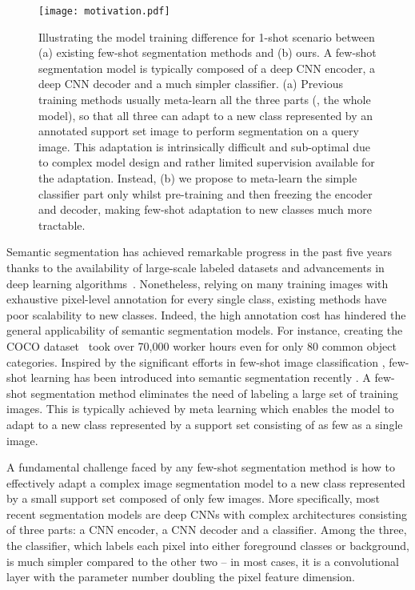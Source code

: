 \documentclass[10pt,twocolumn,letterpaper]{article}
\begin{document}
\begin{figure}[t]
    \centering
    \texttt{[image: motivation.pdf]}
    \caption{Illustrating the model training difference for 1-shot scenario between (a) existing few-shot segmentation methods and (b) ours. A few-shot segmentation model is typically composed of a deep CNN encoder, a deep CNN decoder and a much simpler classifier. (a) Previous training methods usually meta-learn all the three parts (\ie, the whole model), so that all three can adapt to a new class represented by an annotated support set image to perform segmentation on a query image. This adaptation is intrinsically difficult and sub-optimal due to complex model design and rather limited supervision available for the adaptation. 
    Instead, (b) we propose to meta-learn the simple classifier part only whilst pre-training and then freezing the encoder and decoder,
    making few-shot adaptation to new classes much more tractable.
    }
    \vspace{-0.4cm}
    \label{fig:motivation}
\end{figure}


Semantic segmentation has achieved remarkable progress in the past five years thanks to the availability of large-scale labeled datasets and advancements in deep learning algorithms~\cite{chen2017deeplab, chen2018encoder, long2015fully}. 
Nonetheless, relying on many training images with exhaustive pixel-level annotation for every single class, 
existing methods have poor scalability to new classes.  
Indeed, the high annotation cost
has hindered the general applicability of semantic segmentation models.  
For instance, creating the COCO dataset~\cite{lin2014microsoft} took over 70,000 worker hours
even for only 80 common object categories.
Inspired by the significant efforts in 
few-shot image classification \cite{snell2017prototypical,finn2017model,sung2018learning,ye2020few},
few-shot learning has been 
introduced into semantic segmentation recently
\cite{shaban2017one,nguyen2019feature, cao2020few, wang2019panet, yang2020prototype, zhang2019canet, zhang2020sg}.
A few-shot segmentation method eliminates the need of labeling a large set of training images. This is typically achieved by meta learning which enables the model to adapt to a new class represented by a support set consisting of as few as a single image. 







A fundamental challenge faced by any few-shot segmentation method is how to effectively adapt a complex image segmentation model to a new class represented by a small support set composed of only few images. More specifically, most recent segmentation models are deep CNNs with  complex architectures consisting of three parts: a CNN encoder, a CNN decoder and a classifier. Among the three, the classifier, which labels each pixel into either foreground classes or background, is much simpler compared to the other two -- in most cases, it is a  convolutional layer with the parameter number doubling the pixel feature dimension. 
\end{document}
